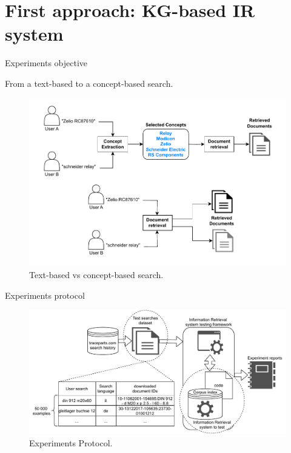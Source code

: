 \section{First approach: KG-based IR system}

\begin{frame}{Experiments objective}

    \begin{center}
        From a text-based to a concept-based search.
    \end{center}

    \begin{figure} [H]
        \begin{center}
            \includegraphics[scale=0.6]{images/text-vs-concept-based-search.pdf} 
            \caption{Text-based vs concept-based search.} 
        \end{center}
    \end{figure}

\end{frame}

\begin{frame}{Experiments protocol}

    \begin{figure} [H]
        \begin{center}
            \includegraphics[scale=0.6]{images/tp-search-expe-setting.pdf} 
            \caption{Experiments Protocol.} 
        \end{center}
    \end{figure}

\end{frame}

